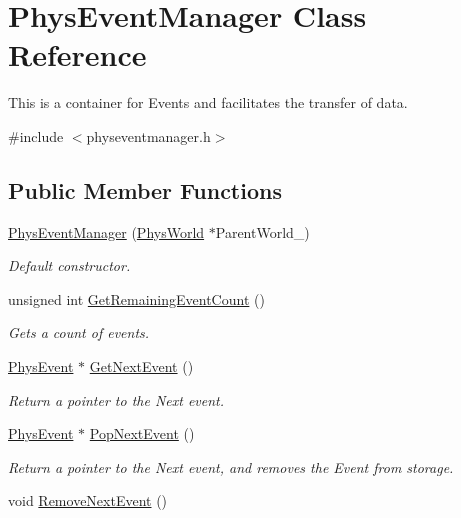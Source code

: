 \hypertarget{classPhysEventManager}{
\section{PhysEventManager Class Reference}
\label{d5/dd7/classPhysEventManager}
}


This is a container for Events and facilitates the transfer of data.  


{\ttfamily \#include $<$physeventmanager.h$>$}\subsection*{Public Member Functions}
\begin{DoxyCompactItemize}
\item 
\hyperlink{classPhysEventManager_a1355f36d99de303cec6f3b27cadaa9ff}{PhysEventManager} (\hyperlink{classPhysWorld}{PhysWorld} $\ast$ParentWorld\_\-)
\begin{DoxyCompactList}\small\item\em Default constructor. \item\end{DoxyCompactList}\item 
unsigned int \hyperlink{classPhysEventManager_ab14d238e7abe9919be8e2d9eef388b64}{GetRemainingEventCount} ()
\begin{DoxyCompactList}\small\item\em Gets a count of events. \item\end{DoxyCompactList}\item 
\hyperlink{classPhysEvent}{PhysEvent} $\ast$ \hyperlink{classPhysEventManager_a6de94bc6c23dcbd7e15785cadee2e80b}{GetNextEvent} ()
\begin{DoxyCompactList}\small\item\em Return a pointer to the Next event. \item\end{DoxyCompactList}\item 
\hyperlink{classPhysEvent}{PhysEvent} $\ast$ \hyperlink{classPhysEventManager_a3122b32172326ac32cfecc828b820977}{PopNextEvent} ()
\begin{DoxyCompactList}\small\item\em Return a pointer to the Next event, and removes the Event from storage. \item\end{DoxyCompactList}\item 
void \hyperlink{classPhysEventManager_ad040054bd9018ff0fd27ad78ec1e87fa}{RemoveNextEvent} ()

\end{DoxyCompactItemize}

